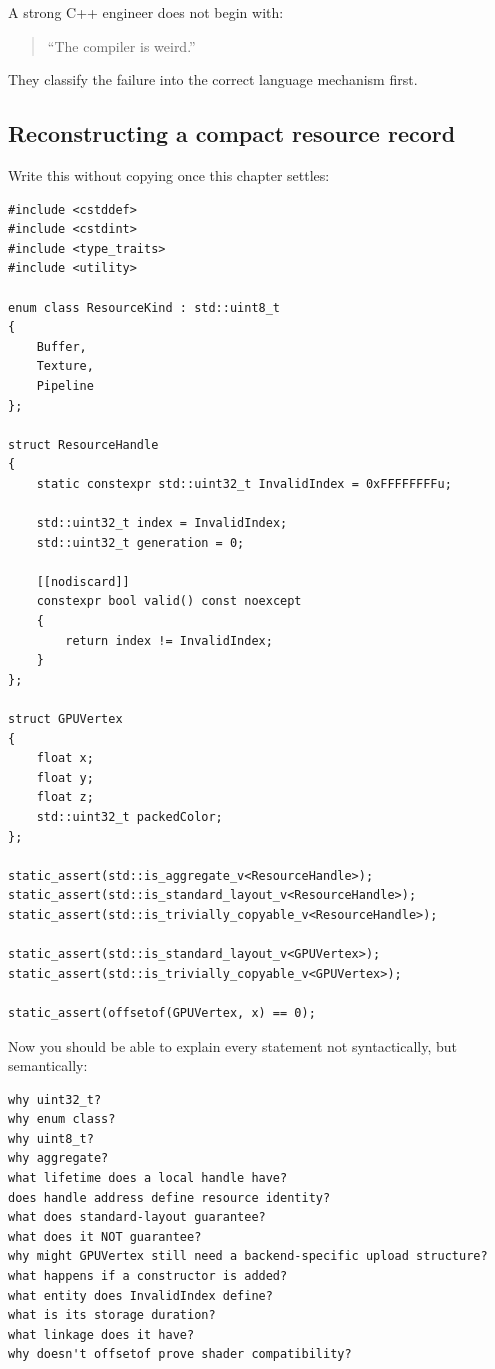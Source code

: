 A strong C++ engineer does not begin with:

\begin{quote}
``The compiler is weird.''
\end{quote}

They classify the failure into the correct language mechanism first.

\subsection{Reconstructing a compact resource record}\label{reconstructing-a-compact-resource-record}

Write this without copying once this chapter settles:

\begin{verbatim}
#include <cstddef>
#include <cstdint>
#include <type_traits>
#include <utility>

enum class ResourceKind : std::uint8_t
{
    Buffer,
    Texture,
    Pipeline
};

struct ResourceHandle
{
    static constexpr std::uint32_t InvalidIndex = 0xFFFFFFFFu;

    std::uint32_t index = InvalidIndex;
    std::uint32_t generation = 0;

    [[nodiscard]]
    constexpr bool valid() const noexcept
    {
        return index != InvalidIndex;
    }
};

struct GPUVertex
{
    float x;
    float y;
    float z;
    std::uint32_t packedColor;
};

static_assert(std::is_aggregate_v<ResourceHandle>);
static_assert(std::is_standard_layout_v<ResourceHandle>);
static_assert(std::is_trivially_copyable_v<ResourceHandle>);

static_assert(std::is_standard_layout_v<GPUVertex>);
static_assert(std::is_trivially_copyable_v<GPUVertex>);

static_assert(offsetof(GPUVertex, x) == 0);
\end{verbatim}

Now you should be able to explain every statement not syntactically, but semantically:

\begin{verbatim}
why uint32_t?
why enum class?
why uint8_t?
why aggregate?
what lifetime does a local handle have?
does handle address define resource identity?
what does standard-layout guarantee?
what does it NOT guarantee?
why might GPUVertex still need a backend-specific upload structure?
what happens if a constructor is added?
what entity does InvalidIndex define?
what is its storage duration?
what linkage does it have?
why doesn't offsetof prove shader compatibility?
\end{verbatim}

